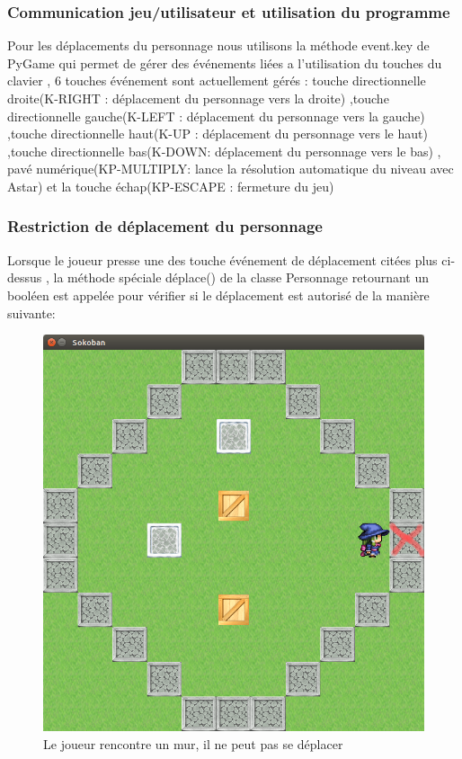 \documentclass{article}
\begin{document}
		\subsubsection{Communication jeu/utilisateur et utilisation du programme}
		
			Pour les déplacements du personnage nous utilisons la méthode event.key de PyGame qui permet de gérer des événements liées a l'utilisation du touches du clavier , 6 touches événement sont actuellement gérés : touche directionnelle droite(K-RIGHT : déplacement du personnage vers la droite) ,touche directionnelle gauche(K-LEFT : déplacement du personnage vers la gauche) ,touche directionnelle haut(K-UP : déplacement du personnage vers le haut) ,touche directionnelle bas(K-DOWN: déplacement du personnage vers le bas) , pavé numérique(KP-MULTIPLY: lance la résolution automatique du niveau avec Astar) et la touche échap(KP-ESCAPE : fermeture du jeu)
		\subsubsection{Restriction de déplacement du personnage}		
		Lorsque le joueur presse une des touche événement de déplacement citées plus ci-dessus , la méthode spéciale déplace() de la classe Personnage retournant un booléen est appelée pour vérifier si le déplacement est autorisé de la manière suivante:
\begin{figure}[!h]
\centering
\includegraphics[scale=0.25]{img/01.png}
\caption{Le joueur rencontre un mur, il ne peut pas se déplacer}			
\end{figure}
\end{document}
